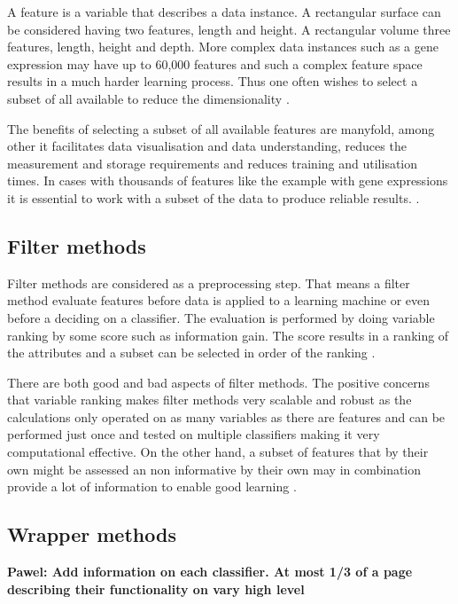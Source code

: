 A feature is a variable that describes a data instance. A rectangular surface can be considered having two features, length and height. A rectangular volume three features, length, height and depth. More complex data instances such as a gene expression may have up to 60,000 features and such a complex feature space results in a much harder learning process. Thus one often wishes to select a subset of all available to reduce the dimensionality \parencite{guyon2003}.

The benefits of selecting a subset of all available features are manyfold, among other it facilitates data visualisation and data understanding, reduces the measurement and storage requirements and reduces training and utilisation times. In cases with thousands of features like the example with gene expressions it is essential to work with a subset of the data to produce reliable results. \parencite{guyon2003}.


\subsection{Filter methods}

Filter methods are considered as a preprocessing step. That means a filter method evaluate features before data is applied to a learning machine or even before a deciding on a classifier. The evaluation is performed by doing variable ranking by some score such as information gain. The score results in a ranking of the attributes and a subset can be selected in order of the ranking \parencite{guyon2003}.

There are both good and bad aspects of filter methods. The positive concerns that variable ranking makes filter methods very scalable and robust as the calculations only operated on as many variables as there are features and can be performed just once and tested on multiple classifiers making it very computational effective. On the other hand, a subset of features that by their own might be assessed an non informative by their own may in combination provide a lot of information to enable good learning \parencite{guyon2003}.


\subsection{Wrapper methods}

\textbf{ Pawel: Add information on each classifier. At most 1/3 of a page describing their functionality on  vary high level }

